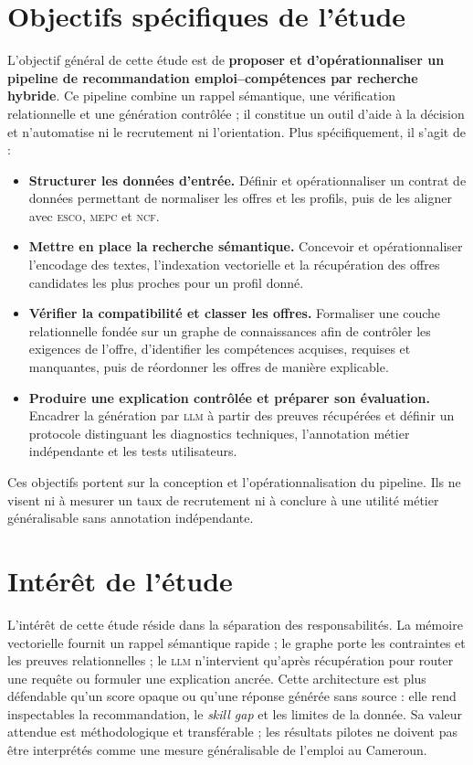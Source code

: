 \documentclass[12pt,twoside]{report}
\newcommand{\ESCO}{\textsc{esco}}
\newcommand{\MEPC}{\textsc{mepc}}
\newcommand{\NCF}{\textsc{ncf}}
\newcommand{\LLM}{\textsc{llm}}
\begin{document}
\section*{Objectifs spécifiques de l'étude}
L'objectif général de cette étude est de \textbf{proposer et d'opérationnaliser un pipeline de recommandation emploi--compétences par recherche hybride}. Ce pipeline combine un rappel sémantique, une vérification relationnelle et une génération contrôlée ; il constitue un outil d'aide à la décision et n'automatise ni le recrutement ni l'orientation. Plus spécifiquement, il s'agit de :
\begin{itemize}
    \item \textbf{Structurer les données d'entrée.} Définir et opérationnaliser un contrat de données permettant de normaliser les offres et les profils, puis de les aligner avec \ESCO{}, \MEPC{} et \NCF{}.
    \item \textbf{Mettre en place la recherche sémantique.} Concevoir et opérationnaliser l'encodage des textes, l'indexation vectorielle et la récupération des offres candidates les plus proches pour un profil donné.
    \item \textbf{Vérifier la compatibilité et classer les offres.} Formaliser une couche relationnelle fondée sur un graphe de connaissances afin de contrôler les exigences de l'offre, d'identifier les compétences acquises, requises et manquantes, puis de réordonner les offres de manière explicable.
    \item \textbf{Produire une explication contrôlée et préparer son évaluation.} Encadrer la génération par \LLM{} à partir des preuves récupérées et définir un protocole distinguant les diagnostics techniques, l'annotation métier indépendante et les tests utilisateurs.
\end{itemize}
Ces objectifs portent sur la conception et l'opérationnalisation du pipeline. Ils ne visent ni à mesurer un taux de recrutement ni à conclure à une utilité métier généralisable sans annotation indépendante.
\section*{Intérêt de l'étude }
L'intérêt de cette étude réside dans la séparation des responsabilités. La mémoire vectorielle fournit un rappel sémantique rapide ; le graphe porte les contraintes et les preuves relationnelles ; le \LLM{} n'intervient qu'après récupération pour router une requête ou formuler une explication ancrée. Cette architecture est plus défendable qu'un score opaque ou qu'une réponse générée sans source : elle rend inspectables la recommandation, le \textit{skill gap} et les limites de la donnée. Sa valeur attendue est méthodologique et transférable ; les résultats pilotes ne doivent pas être interprétés comme une mesure généralisable de l'emploi au Cameroun.
\vspace{-0.5cm}
\end{document}

